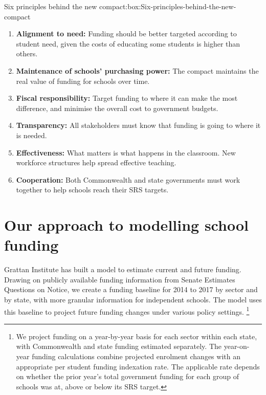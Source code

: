 \documentclass{grattan}
\begin{document}
\begin{verysmallbox}{Six principles behind the new compact:}{box:Six-principles-behind-the-new-compact}
\begin{enumerate}[leftmargin=1.7em]
\item \textbf{Alignment to need:}
Funding should be better targeted according to student need, given the costs of educating some students is higher than others.

\item \textbf{Maintenance of schools' purchasing power:}
The compact maintains the real value of funding for schools over time.

\item \textbf{Fiscal responsibility:} Target funding to where it can make the most difference, and minimise the overall cost to government budgets.

\item \textbf{Transparency:}
All stakeholders must know that funding is going to where it is needed.

\item \textbf{Effectiveness:}
What matters is what happens in the classroom. New workforce structures help spread effective teaching.

\item \textbf{Cooperation:} Both Commonwealth and state governments must work together to help schools reach their SRS targets.
\end{enumerate}
\end{verysmallbox}

\section{Our approach to modelling school funding}\label{sec:how-does-report-model-school-funding}

Grattan Institute has built a model to estimate current and future funding.
Drawing on publicly available funding information from Senate Estimates Questions on Notice, we create a funding baseline for 2014 to 2017 by sector and by state, with more granular information for independent schools.
The model uses this baseline to project future funding changes under various policy settings.%
\footnote{We project funding on a year-by-year basis for each sector within each state, with Commonwealth and state funding estimated separately.
The year-on-year funding calculations combine projected enrolment changes with an appropriate per student funding indexation rate.
The applicable rate depends on whether the prior year's total government funding for each group of schools was at, above or below its SRS target.}
\end{document}
